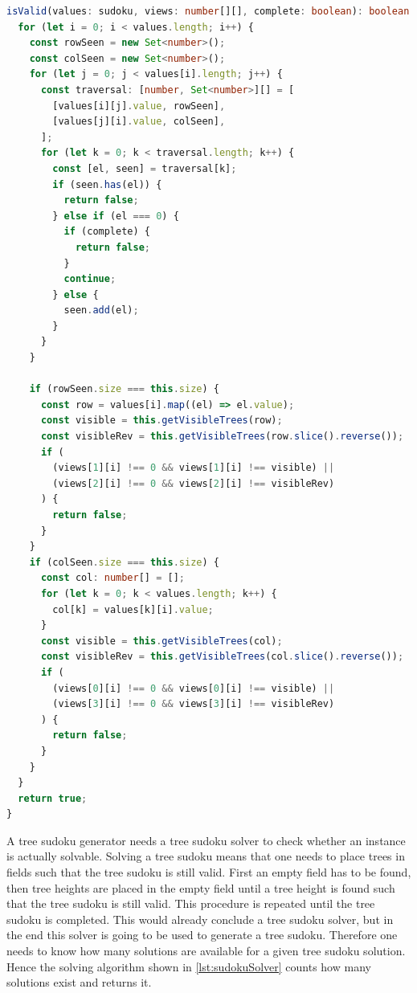 \begin{lstlisting}[language=TypeScript,caption={Validation algorithm for a tree sudoku instance},label={lst:sudokuValidation}]
isValid(values: sudoku, views: number[][], complete: boolean): boolean {
  for (let i = 0; i < values.length; i++) {
    const rowSeen = new Set<number>();
    const colSeen = new Set<number>();
    for (let j = 0; j < values[i].length; j++) {
      const traversal: [number, Set<number>][] = [
        [values[i][j].value, rowSeen],
        [values[j][i].value, colSeen],
      ];
      for (let k = 0; k < traversal.length; k++) {
        const [el, seen] = traversal[k];
        if (seen.has(el)) {
          return false;
        } else if (el === 0) {
          if (complete) {
            return false;
          }
          continue;
        } else {
          seen.add(el);
        }
      }
    }

    if (rowSeen.size === this.size) {
      const row = values[i].map((el) => el.value);
      const visible = this.getVisibleTrees(row);
      const visibleRev = this.getVisibleTrees(row.slice().reverse());
      if (
        (views[1][i] !== 0 && views[1][i] !== visible) ||
        (views[2][i] !== 0 && views[2][i] !== visibleRev)
      ) {
        return false;
      }
    }
    if (colSeen.size === this.size) {
      const col: number[] = [];
      for (let k = 0; k < values.length; k++) {
        col[k] = values[k][i].value;
      }
      const visible = this.getVisibleTrees(col);
      const visibleRev = this.getVisibleTrees(col.slice().reverse());
      if (
        (views[0][i] !== 0 && views[0][i] !== visible) ||
        (views[3][i] !== 0 && views[3][i] !== visibleRev)
      ) {
        return false;
      }
    }
  }
  return true;
}
\end{lstlisting}

A tree sudoku generator needs a tree sudoku solver to check whether an instance is actually solvable. Solving a tree sudoku means that one needs to place trees in fields such that the tree sudoku is still valid. First an empty field has to be found, then tree heights are placed in the empty field until a tree height is found such that the tree sudoku is still valid. This procedure is repeated until the tree sudoku is completed. This would already conclude a tree sudoku solver, but in the end this solver is going to be used to generate a tree sudoku. Therefore one needs to know how many solutions are available for a given tree sudoku solution. Hence the solving algorithm shown in \ref{lst:sudokuSolver} counts how many solutions exist and returns it.

